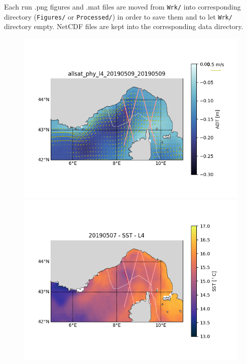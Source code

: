 \documentclass[12pt,a4paper]{article}
\begin{document}
Each run .png figures and .mat files are moved from \texttt{Wrk/} into corresponding directory (\texttt{Figures/} or \texttt{Processed/}) in order to save them and to let \texttt{Wrk/} directory empty. NetCDF files are kept into the corresponding data directory.\newline


\begin{figure}[h!]
\includegraphics[scale=0.5]{Figures/nrt_med_allsat_phy_l4.png}
\includegraphics[scale=0.5]{Figures/GOS-L4_GHRSST-SSTfnd-OISST_HR_NRT-MED.png}
\begin{center}

\end{center}
\end{figure}
\end{document}
